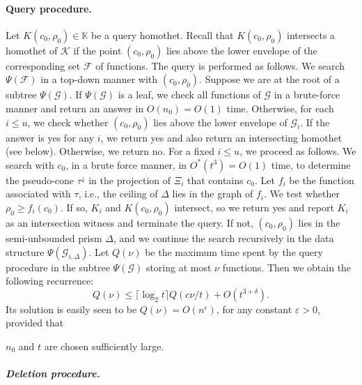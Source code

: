 \documentclass[11pt]{article}
\newif\ifsocgproc
\def\Kspace{{\mathbb K}}
\def\eps{{\varepsilon}}
\def\F{\mathcal{F}}
\def\G{\mathcal{G}}
\def\K{\mathcal{K}}
\def\cell{\tau}
\def\ceil#1{\lceil #1\rceil}
\theoremstyle{definition}
\begin{document}
\paragraph{Query procedure.}
\fi
Let $K(c_0,\rho_0)\in\Kspace$ be a query homothet.
Recall that $K(c_0,\rho_0)$ intersects a homothet of $\K$ if the point $(c_0,\rho_0)$ lies above the 
lower envelope of the corresponding set $\F$ of functions. The query is performed as follows. 
We search $\Psi(\F)$ in a top-down manner with $(c_0,\rho_0)$. Suppose we are at the root of a subtree
$\Psi(\G)$. If $\Psi(\G)$ is a leaf, we check all functions of $\G$ in a brute-force manner and 
return an answer in $O(n_0)=O(1)$ time. Otherwise, for each $i \le u$, we check whether $(c_0,\rho_0)$ 
lies above the lower envelope of $\G_i$. If the answer is yes for any $i$, 
we return yes and also return an intersecting homothet (see below).  Otherwise, we return no.
%
For a fixed $i\le u$, we proceed as follows.
We search with $c_0$, in a brute force manner, in $O^*(t^3) = O(1)$ time, 
to determine the pseudo-cone $\cell^\downarrow$ in  the projection of $\Xi_i$
that contains $c_0$. Let $f_i$ be the  function associated with $\cell$, i.e., 
the ceiling of $\Delta$ lies in the graph of $f_i$.
We test whether $\rho_0 \ge f_i(c_0)$. If so, $K_i$ and $K(c_0,\rho_0)$ intersect, so we
return yes and report $K_i$ as an intersection witness and terminate the query. If not, $(c_0,\rho_0)$
lies in the semi-unbounded prism $\Delta$,
and we continue the search recursively in the data structure $\Psi(\G_{i,\Delta})$.
%
Let $Q(\nu)$ be the maximum time spent by the query procedure in the subtree $\Psi(\G)$ 
storing at most $\nu$ functions. Then we obtain the following recurrence:
\[ Q(\nu) \le \ceil{\log_2 t} Q(c\nu/t) + O(t^{3+\delta}) .\]
Its solution is easily seen to be $Q(\nu) = O(n^\eps)$, for any constant $\eps>0$, provided that 
\ifsocgproc
$n_0$ and $t$ are chosen sufficiently large.
\else 
	$n_0$ and $t$ are chosen sufficiently large.
  \fi
%
\ifsocgproc 
\subparagraph*{Deletion procedure.}
\else
\end{document}
